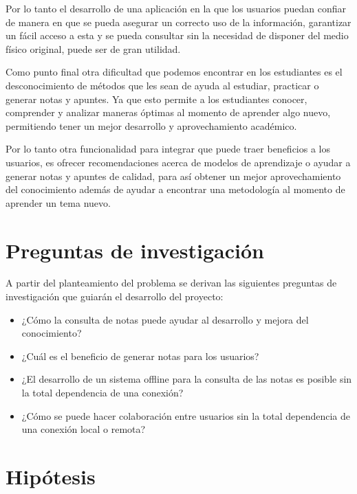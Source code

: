 \vspace{.5cm}

Por lo tanto el desarrollo de una aplicación en la que los usuarios puedan confiar de manera en que se pueda asegurar un correcto uso de la información, garantizar un fácil acceso a esta y se pueda consultar sin la necesidad de disponer del medio físico original, puede ser de gran utilidad.

\vspace{.5cm}

Como punto final otra dificultad que podemos encontrar en los estudiantes es el desconocimiento de métodos que les sean de ayuda al estudiar, practicar o generar notas y apuntes. Ya que esto permite a los estudiantes conocer, comprender y analizar maneras óptimas al momento de aprender algo nuevo, permitiendo tener un mejor desarrollo y aprovechamiento académico. 

\vspace{.5cm}

Por lo tanto otra funcionalidad para integrar que puede traer beneficios a los usuarios, es ofrecer recomendaciones acerca de modelos de aprendizaje o ayudar a generar notas y apuntes de calidad, para así obtener un mejor aprovechamiento del conocimiento además de ayudar a encontrar una metodología al momento de aprender un tema nuevo.

\section{Preguntas de investigación}
\noindent A partir del planteamiento del problema se derivan las siguientes preguntas de investigación que guiarán el desarrollo del proyecto:
\begin{itemize}[label={}]
\item ¿Cómo la consulta de notas puede ayudar al desarrollo y mejora del conocimiento?
\item ¿Cuál es el beneficio de generar notas para los usuarios?
\item ¿El desarrollo de un sistema offline para la consulta de las notas es posible sin la total dependencia de una conexión?
\item ¿Cómo se puede hacer colaboración entre usuarios sin la total dependencia de una conexión local o remota?
\end{itemize}

\section{Hipótesis}

